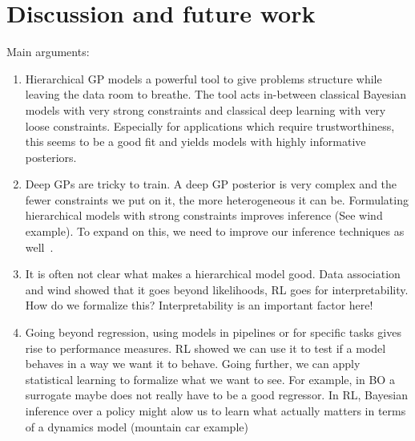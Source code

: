 \chapter{Discussion and future work}
\label{toc:discussion}
Main arguments:
\begin{enumerate}
    \item Hierarchical GP models a powerful tool to give problems structure while leaving the data room to breathe. The tool acts in-between classical Bayesian models with very strong constraints and classical deep learning with very loose constraints. Especially for applications which require trustworthiness, this seems to be a good fit and yields models with highly informative posteriors.
    \item Deep GPs are tricky to train. A deep GP posterior is very complex and the fewer constraints we put on it, the more heterogeneous it can be. Formulating hierarchical models with strong constraints improves inference (See wind example). To expand on this, we need to improve our inference techniques as well~\parencite{ustyuzhaninov_compositional_2020}.
    \item It is often not clear what makes a hierarchical model good. Data association and wind showed that it goes beyond likelihoods, RL goes for interpretability. How do we formalize this? Interpretability is an important factor here!
    \item Going beyond regression, using models in pipelines or for specific tasks gives rise to performance measures. RL showed we can use it to test if a model behaves in a way we want it to behave. Going further, we can apply statistical learning to formalize what we want to see. For example, in BO a surrogate maybe does not really have to be a good regressor. In RL, Bayesian inference over a policy might alow us to learn what actually matters in terms of a dynamics model (mountain car example)
\end{enumerate}


